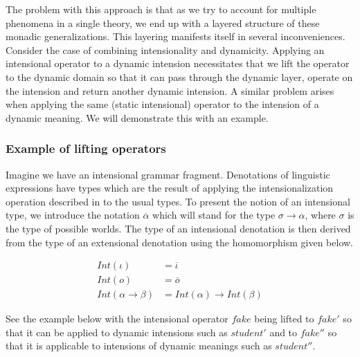 \documentclass{article}
\newcommand{\intens}[1]{\overline{#1}}
\begin{document}
The problem with this approach is that as we try to account for multiple
phenomena in a single theory, we end up with a layered structure of these
monadic generalizations. This layering manifests itself in several
inconveniences. Consider the case of combining intensionality and
dynamicity. Applying an intensional operator to a dynamic intension
necessitates that we lift the operator to the dynamic domain so that it can
pass through the dynamic layer, operate on the intension and return another
dynamic intension. A similar problem arises when applying the same (static
intensional) operator to the intension of a dynamic meaning. We will
demonstrate this with an example.

\subsubsection{Example of lifting operators}

Imagine we have an intensional grammar fragment. Denotations of linguistic
expressions have types which are the result of applying the intensionalization
operation described in \citet{de2013note} to the usual types. To present the
notion of an intensional type, we introduce the notation $\intens{\alpha}$
which will stand for the type $\sigma \to \alpha$, where $\sigma$ is the type
of possible worlds. The type of an intensional denotation is then derived from
the type of an extensional denotation using the homomorphism given below.

\begin{align*}
  Int(\iota) & = \intens{\iota} \\
  Int(o) & = \intens{o} \\
  Int(\alpha \to \beta) & = Int(\alpha) \to Int(\beta)
\end{align*}

See the example below with the intensional operator $fake$ being lifted to
$fake'$ so that it can be applied to dynamic intensions such as $student'$ and
to $fake''$ so that it is applicable to intensions of dynamic meanings such as
$student''$.
\end{document}
